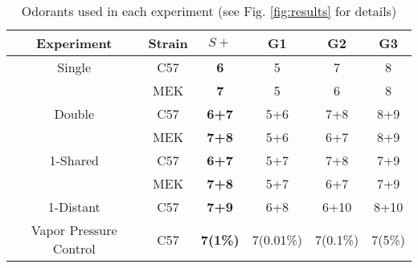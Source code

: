 \begin{table}
\label{tab:design}
    \begin{tabular}{ c | c | c | c | c | c }
        Experiment & Strain & \textbf{$S+$} & G1 & G2 & G3 \\ 
        \hline
        Single & C57 & \textbf{6} & 5 & 7 & 8 \\ 
         & MEK & \textbf{7} & 5 & 6 & 8 \\ 
        \hline
        Double & C57 & \textbf{6+7} & 5+6 & 7+8 & 8+9 \\ 
         & MEK & \textbf{7+8} & 5+6 & 6+7 & 8+9 \\ 
        \hline
        1-Shared & C57 & \textbf{6+7} & 5+7 & 7+8 & 7+9 \\ 
         & MEK & \textbf{7+8} & 5+7 & 6+7 & 7+9 \\ 
        \hline
        1-Distant & C57 & \textbf{7+9} & 6+8 & 6+10 & 8+10 \\ 
        Vapor Pressure Control & C57 & \textbf{7(1\%)} & 7(0.01\%) & 7(0.1\%) & 7(5\%) \\ 
    \end{tabular}
    \caption{Odorants used in each experiment (see Fig. \ref{fig:results} for details)}
\end{table}